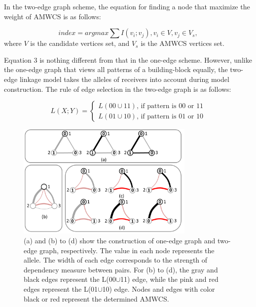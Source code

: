 In the two-edge graph scheme, the equation for finding a node that maximize the weight of AMWCS is as follows:

\begin{equation} \textit{index} = argmax\sum I(v_i;v_j), {v_i\in V}, {v_j \in V_s},\end{equation}
where $V$ is the candidate vertices set, and $V_s$ is the AMWCS vertices set.

Equation 3 is nothing different from that in the one-edge scheme. However, unlike the one-edge graph that views all patterns of a building-block equally, the two-edge linkage model takes the alleles of receivers into account during model construction. The rule of edge selection in the two-edge graph is as follows:

\begin{equation}
L(X;Y) = 
   \begin{cases}
    L(00\cup11) \text{, if pattern is 00 or 11} \\
    L(01\cup10) \text{, if pattern is 01 or 10} 
	\end{cases}
\end{equation}



\begin{figure}
\centering
\includegraphics[width=3.4in]{AMWCS}
\caption{(a)  and (b) to (d) show the construction of  one-edge graph and two-edge graph, respectively. The value in each node represents the allele. The width of each edge corresponds to the strength of dependency measure between pairs. For (b) to (d), the gray and black edges represent the L(00$\cup$11) edge, while the pink and red edges represent the L(01$\cup$10) edge. Nodes and edges with color black or red represent the determined AMWCS.}
\end{figure}


